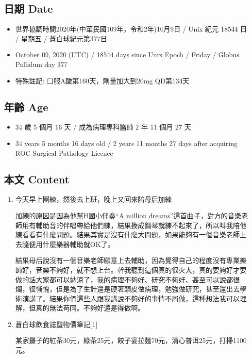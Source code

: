 \documentclass[
]{article}
\providecommand{\tightlist}{%
  \setlength{\itemsep}{0pt}\setlength{\parskip}{0pt}}
\begin{document}
\hypertarget{ux65e5ux671f-date-8}{%
\subsection{日期 Date}\label{ux65e5ux671f-date-8}}

\begin{itemize}
\tightlist
\item
  世界協調時間2020年(中華民國109年，令和2年)10月9日 / Unix 紀元 18544 日
  / 星期五 / 蒼白球紀元第377日
\item
  October 09, 2020 (UTC) / 18544 days since Unix Epoch / Friday / Globus
  Pallidum day 377
\item
  特殊註記: 口服A酸第160天，劑量加大到20mg QD第134天
\end{itemize}

\hypertarget{ux5e74ux9f61-age-8}{%
\subsection{年齡 Age}\label{ux5e74ux9f61-age-8}}

\begin{itemize}
\tightlist
\item
  34 歲 5 個月 16 天 / 成為病理專科醫師 2 年 11 個月 27 天
\item
  34 years 5 months 16 days old / 2 years 11 months 27 days after
  acquiring ROC Surgical Pathology Licence
\end{itemize}

\hypertarget{ux672cux6587-content-8}{%
\subsection{本文 Content}\label{ux672cux6587-content-8}}

\begin{enumerate}
\def\labelenumi{\arabic{enumi}.}
\item
  今天早上團練，然後去上班，晚上又回來陪母后加練

  加練的原因是因為他幫H國小伴奏``A million
  dreams''這首曲子，對方的音樂老師用有輔助音的伴唱帶給他們練，結果換成鋼琴就練不起來了，所以叫我陪他練看看有什麼問題。結果其實是沒有什麼大問題，如果能夠有一個音樂老師上去隨便用什麼樂器輔助就OK了。

  結果母后說沒有一個音樂老師願意上去輔助，因為覺得自己的程度沒有專業樂師好，音樂不夠好，就不想上台。幹我聽到這個真的很火大，真的要夠好才要做的話大家都可以納涼了，我的病理不夠好、研究不夠好、甚至可以說都很爛，很慚愧，但是為了生計還是硬著頭皮做病理，勉強做研究，甚至還出去學術演講了。結果你們這些人跟我講說不夠好的事情不屑做，這種想法我可以理解，但真的無法苟同。不夠好還是得做啊。
\item
  蒼白球飲食誌暨物價筆記{[}1{]}

  某家攤子的紅茶30元，綠茶25元，餃子宴拉麵70元，清心普洱25元，打掃1100元。
\end{enumerate}
\end{document}
